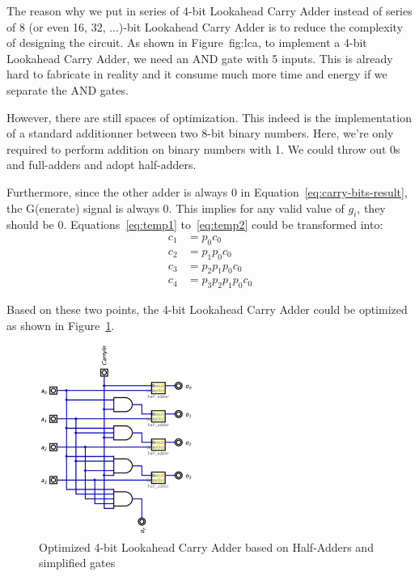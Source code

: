 \documentclass[conference]{IEEEtran}
\begin{document}
The reason why we put in series of 4-bit Lookahead Carry Adder instead of series of 8 (or even 16, 32, ...)-bit Lookahead Carry Adder is to reduce the complexity of designing the circuit.
As shown in Figure~{fig:lca}, to implement a 4-bit Lookahead Carry Adder, we need an AND gate with 5 inputs. This is already hard to fabricate in reality and it consume much more time and energy if we separate the AND gates.

However, there are still spaces of optimization. This indeed is the implementation of a standard additionner between two 8-bit binary numbers. Here, we're only required to perform addition on binary numbers with 1.
We could throw out 0s and full-adders and adopt half-adders.

Furthermore, since the other adder is always 0 in Equation~\ref{eq:carry-bits-result}, the G(enerate) signal is always 0. This implies for any valid value of $g_i$, they should be 0. Equations~\ref{eq:temp1} to~\ref{eq:temp2} could be transformed into:
\begin{align}
    c_1 &= p_0 c_0 \\
    c_2 &= p_1 p_0 c_0 \\
    c_3 &= p_2 p_1 p_0 c_0 \\
    c_4 &= p_3 p_2 p_1 p_0 c_0
\end{align}

Based on these two points, the 4-bit Lookahead Carry Adder could be optimized as shown in Figure~\ref{fig:lca-optimize}.


\begin{figure}[h!]
    \centering
    \includegraphics[width=0.45\textwidth]{assets/adder_4bits_copy.png}
    \caption{Optimized 4-bit Lookahead Carry Adder based on Half-Adders and simplified gates}
    \label{fig:lca-optimize}
    \end{figure}
\end{document}
